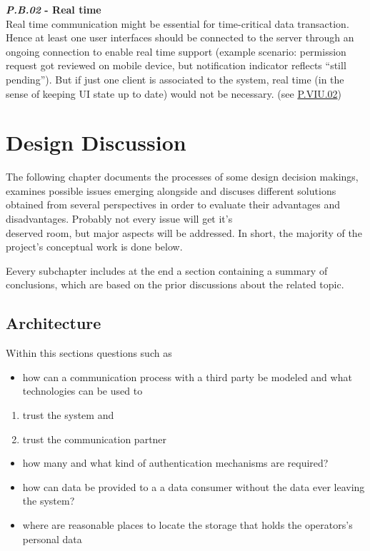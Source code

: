 \documentclass[12pt,english,a4paper,titlepage,cleardoublepage=empty,dottedtoc]{report}
\providecommand{\tightlist}{%
  \setlength{\itemsep}{0pt}\setlength{\parskip}{0pt}}
\begin{document}
\textbf{\emph{\protect\hypertarget{pb02}{}{P.B.02}} - Real time}\\
Real time communication might be essential for time-critical data
transaction. Hence at least one user interfaces should be connected to
the server through an ongoing connection to enable real time support
(example scenario: permission request got reviewed on mobile device, but
notification indicator reflects ``still pending''). But if just one
client is associated to the system, real time (in the sense of keeping
UI state up to date) would not be necessary. (see
\protect\hyperlink{pviu02ux5cux257D}{P.VIU.02})

\chapter{Design Discussion}\label{design-discussion}

The following chapter documents the processes of some design decision
makings, examines possible issues emerging alongside and discuses
different solutions obtained from several perspectives in order to
evaluate their advantages and disadvantages. Probably not every issue
will get it's\\
deserved room, but major aspects will be addressed. In short, the
majority of the project's conceptual work is done below.

Eevery subchapter includes at the end a section containing a summary of
conclusions, which are based on the prior discussions about the related
topic.

\section{Architecture}\label{architecture}

Within this sections questions such as

\begin{itemize}
\tightlist
\item
  how can a communication process with a third party be modeled and what
  technologies can be used to
\end{itemize}

\begin{enumerate}
\def\labelenumi{(\Alph{enumi})}
\tightlist
\item
  trust the system and
\item
  trust the communication partner
\end{enumerate}

\begin{itemize}
\tightlist
\item
  how many and what kind of authentication mechanisms are required?
\item
  how can data be provided to a a data consumer without the data ever
  leaving the system?
\item
  where are reasonable places to locate the storage that holds the
  operators's personal data
\end{itemize}
\end{document}

